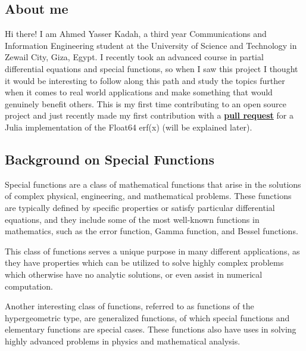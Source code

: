 \documentclass{article}
\theoremstyle{mytheoremstyle}
\theoremstyle{mytheoremstyle}
\theoremstyle{myproblemstyle}
\begin{document}
    \subsection*{About me 
      \href{https://github.com/AhmedYKadah}{\faGithub}    
      \href{https://linkedin.com/in/ahmed-yasser-kadah-83687b269}{\faLinkedin}    
      \href{mailto:ahmadyassermo@gmail.com}{\faEnvelope[regular]}    
    }\label{sub:About} 
      Hi there! I am Ahmed Yasser Kadah, a third year Communications and Information Engineering student at the University of Science and Technology in Zewail City, Giza, Egypt.
      I recently took an advanced course in partial differential equations and special functions, so when I saw this project I thought it would be interesting to follow along this path and study the topics further when it comes to real world applications and make something that would genuinely benefit others. 
      This is my first time contributing to an open source project and just recently made my first contribution with a \href{https://github.com/JuliaMath/SpecialFunctions.jl/pull/491}{\textbf{pull request}} for a Julia implementation of the Float64 erf(x) (will be explained later). 





    \subsection*{Background on Special Functions}\label{sub:Background } %
    Special functions are a class of mathematical functions that arise in the solutions of complex physical, engineering, and mathematical problems.\cite{sf book, special functions}
   These functions are typically defined by specific properties or satisfy particular differential equations, and they include some of the most well-known functions in mathematics, such as the error function, Gamma function, and Bessel functions.

   This class of functions serves a unique purpose in many different applications, as they have properties which can be utilized to solve highly complex problems which otherwise have no analytic solutions, or even assist in numerical computation.

   Another interesting class of functions, referred to as functions of the hypergeometric type, are generalized functions, of which special functions and elementary functions are special cases. \cite{sf book, hypergeometric functions} 
   These functions also have uses in solving highly advanced problems in physics and mathematical analysis.
\end{document}
